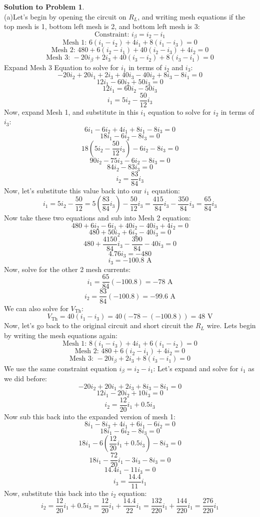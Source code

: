 \documentclass[11pt,letterpaper]{article}
\theoremstyle{definition}
\newtheorem{solprob}{\textcolor{solproblemcolor}{Solution to Problem}}  %
\begin{document}
\begin{solprob} \text{}\\
    (a)Let's begin by opening the circuit on $R_L$, and writing mesh equations if the top mesh is 1, bottom left mesh is 2, and bottom left mesh is 3:
    \[\text{Constraint: } i_\beta=i_2-i_1\]
    \[\text{Mesh 1: }6(i_1-i_2)+4i_1+8(i_1-i_3)=0\]
    \[\text{Mesh 2: }480+6(i_2-i_1)+40(i_2-i_3)+4i_2=0\]
    \[\text{Mesh 3: }-20i_\beta + 2i_3+40(i_3-i_2)+8(i_3-i_1)=0\]
    Expand Mesh 3 Equation to solve for $i_1$ in terms of $i_2$ and $i_3$:
    \[-20i_2+20i_1+2i_3+40i_3-40i_2+8i_3-8i_1=0\]
    \[12i_1-60i_2+50i_3=0\]
    \[12i_1=60i_2-50i_3\]
    \[i_1=5i_2-\frac{50}{12}i_3\]
    Now, expand Mesh 1, and substitute in this $i_1$ equation to solve for $i_2$ in terms of $i_3$:
    \[6i_1-6i_2+4i_1+8i_1-8i_3=0\]
    \[18i_1-6i_2-8i_3=0\]
    \[18(5i_2-\frac{50}{12}i_3)-6i_2-8i_3=0\]
    \[90i_2-75i_3-6i_2-8i_3=0\]
    \[84i_2-83i_3=0\]
    \[i_2=\frac{83}{84}i_3\]
    Now, let's substitute this value back into our $i_1$ equation:
    \[i_1=5i_2-\frac{50}{12} = 5(\frac{83}{84}i_3)-\frac{50}{12}i_3 = \frac{415}{84}i_3-\frac{350}{84}i_3=\frac{65}{84}i_3\]
    Now take these two equations and sub into Mesh 2 equation:
    \[480+6i_2-6i_1+40i_2-40i_3+4i_2=0\]
    \[480+50i_2+6i_2-40i_3=0\]
    \[480+\frac{4150}{84}i_3-\frac{390}{84}-40i_3=0\]
    \[4.76i_3=-480\]
    \[i_3=-100.8\text{ A}\]
    Now, solve for the other 2 mesh currents:
    \[i_1=\frac{65}{84}(-100.8)=-78 \text{ A}\]
    \[i_2=\frac{83}{84}(-100.8)=-99.6 \text{ A}\]
    We can also solve for $V_\text{Th}$:
    \[V_\text{Th} = 40(i_1-i_3) = 40(-78-(-100.8))=48 \text{ V}\]
    Now, let's go back to the original circuit and short circuit the $R_L$ wire.  Lets begin by writing the mesh equations again:
    \[\text{Mesh 1: } 8(i_1-i_3)+4i_1+6(i_1-i_2)=0\]
    \[\text{Mesh 2: } 480+6(i_2-i_1)+4i_2=0\]
    \[\text{Mesh 3: } -20i_\beta + 2i_3+8(i_3-i_1)=0\]
    We use the same constraint equation $i_\beta=i_2-i_1$:
    Let's expand and solve for $i_1$ as we did before:
    \[-20i_2+20i_1+2i_3+8i_3-8i_1=0\]
    \[12i_1-20i_2+10i_3=0\]
    \[i_2=\frac{12}{20}i_1+0.5i_3\]
    Now sub this back into the expanded version of mesh 1:
    \[8i_1-8i_3+4i_1+6i_1-6i_2=0\]
    \[18i_1-6i_2-8i_3=0\]
    \[18i_1-6(\frac{12}{20}i_1+0.5i_3)-8i_3=0\]
    \[18i_1 - \frac{72}{20}i_1-3i_3-8i_3=0\]
    \[14.4i_1-11i_3=0\]
    \[i_3=\frac{14.4}{11}i_1\]
    Now, substitute this back into the $i_2$ equation:
    \[i_2=\frac{12}{20}i_1+0.5i_3=\frac{12}{20}i_1+\frac{14.4}{22}i_1=\frac{132}{220}i_1+\frac{144}{220}i_1=\frac{276}{220}i_1\]

\end{solprob}
\end{document}
